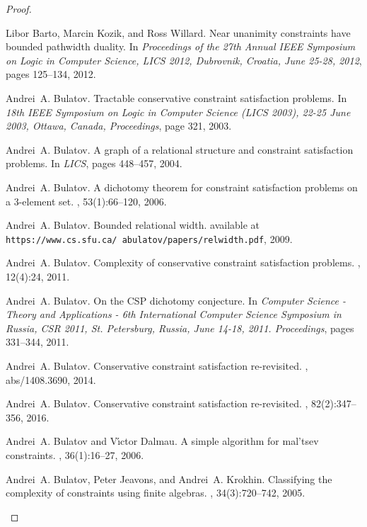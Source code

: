 \documentclass[11pt]{article}
\begin{document}
\begin{proof}
\begin{thebibliography}{10}
Libor Barto, Marcin Kozik, and Ross Willard.
\newblock Near unanimity constraints have bounded pathwidth duality.
\newblock In {\em Proceedings of the 27th Annual {IEEE} Symposium on Logic in
  Computer Science, {LICS} 2012, Dubrovnik, Croatia, June 25-28, 2012}, pages
  125--134, 2012.

Andrei~A. Bulatov.
\newblock Tractable conservative constraint satisfaction problems.
\newblock In {\em 18th {IEEE} Symposium on Logic in Computer Science {(LICS}
  2003), 22-25 June 2003, Ottawa, Canada, Proceedings}, page 321, 2003.

Andrei~A. Bulatov.
\newblock A graph of a relational structure and constraint satisfaction
  problems.
\newblock In {\em {LICS}}, pages 448--457, 2004.

Andrei~A. Bulatov.
\newblock A dichotomy theorem for constraint satisfaction problems on a
  3-element set.
, 53(1):66--120, 2006.

Andrei~A. Bulatov.
\newblock Bounded relational width.
\newblock available at {\tt
  https://www.cs.sfu.ca/~abulatov/papers/relwidth.pdf}, 2009.

Andrei~A. Bulatov.
\newblock Complexity of conservative constraint satisfaction problems.
, 12(4):24, 2011.

Andrei~A. Bulatov.
\newblock On the {CSP} dichotomy conjecture.
\newblock In {\em Computer Science - Theory and Applications - 6th
  International Computer Science Symposium in Russia, {CSR} 2011, St.
  Petersburg, Russia, June 14-18, 2011. Proceedings}, pages 331--344, 2011.

Andrei~A. Bulatov.
\newblock Conservative constraint satisfaction re-revisited.
, abs/1408.3690, 2014.

Andrei~A. Bulatov.
\newblock Conservative constraint satisfaction re-revisited.
, 82(2):347--356, 2016.

Andrei~A. Bulatov and V{\'{\i}}ctor Dalmau.
\newblock A simple algorithm for mal'tsev constraints.
, 36(1):16--27, 2006.

Andrei~A. Bulatov, Peter Jeavons, and Andrei~A. Krokhin.
\newblock Classifying the complexity of constraints using finite algebras.
, 34(3):720--742, 2005.


\end{thebibliography}
\end{proof}
\end{document}
